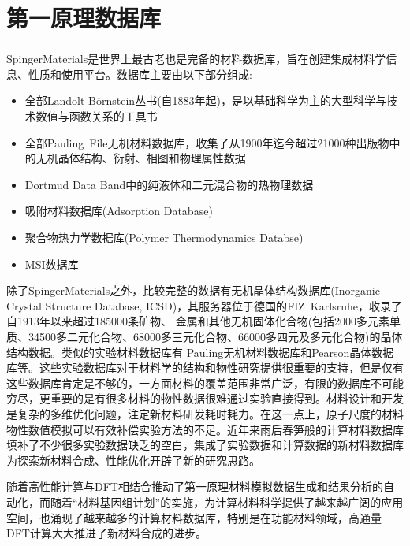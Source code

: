 \section{第一原理数据库}
\frame
{
	\frametitle{}
\textrm{SpingerMaterials}\cite{SpringerM_URL}是世界上最古老也是完备的材料数据库，旨在创建集成材料学信息、性质和使用平台。数据库主要由以下部分组成:
\begin{itemize}
	\item 全部\textrm{Landolt-B{\"o}rnstein}丛书(自1883年起)，是以基础科学为主的大型科学与技术数值与函数关系的工具书
	\item 全部\textrm{Pauling~File}无机材料数据库，收集了从1900年迄今超过21000种出版物中的无机晶体结构、衍射、相图和物理属性数据
	\item \textrm{Dortmud Data Band}中的纯液体和二元混合物的热物理数据
	\item 吸附材料数据库(\textrm{Adsorption Database})
	\item 聚合物热力学数据库(\textrm{Polymer Thermodynamics Databse})
	\item \textrm{MSI}数据库
\end{itemize}

除了\textrm{SpingerMaterials}之外，比较完整的数据有无机晶体结构数据库\textrm{(Inorganic Crystal Structure Database, ICSD)}\cite{ICSD_URL}，其服务器位于德国的\textrm{FIZ~Karlsruhe}，收录了自1913年以来超过185000条矿物、 金属和其他无机固体化合物(包括2000多元素单质、34500多二元化合物、68000多三元化合物、66000多四元及多元化合物)的晶体结构数据。类似的实验材料数据库有%
\textrm{Pauling}无机材料数据库\cite{Pauling_URL}和\textrm{Pearson}晶体数据库\cite{Pearson_URL}等。这些实验数据库对于材料学的结构和物性研究提供很重要的支持，但是仅有这些数据库肯定是不够的，一方面材料的覆盖范围非常广泛，有限的数据库不可能穷尽，更重要的是有很多材料的物性数据很难通过实验直接得到。材料设计和开发是复杂的多维优化问题，注定新材料研发耗时耗力。在这一点上，原子尺度的材料物性数值模拟可以有效补偿实验方法的不足。近年来雨后春笋般的计算材料数据库填补了不少很多实验数据缺乏的空白\cite{CMS58-227_2012}，集成了实验数据和计算数据的新材料数据库为探索新材料合成、性能优化开辟了新的研究思路。

随着高性能计算与\textrm{DFT}相结合推动了第一原理材料模拟数据生成和结果分析的自动化，而随着“材料基因组计划”的实施，为计算材料科学提供了越来越广阔的应用空间，也涌现了越来越多的计算材料数据库，特别是在功能材料领域，高通量\textrm{DFT}计算大大推进了新材料合成的进步。\cite{JCED59-3232_2014, IC53-11849_2014,JPCL4-3607_2013,PCCP16-22073_2014}
}

